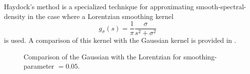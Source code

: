Haydock's method \cite{haydock1972electronic,lin2016review} is a specialized technique for approximating \gls{smooth-spectral-density}
in the case where a Lorentzian smoothing kernel
\begin{equation}
    g_{\sigma}(s) = \frac{1}{\pi} \frac{\sigma}{s^2 + \sigma^2}%
    \label{equ:5-experiments-cauchy-kernel}
\end{equation}
is used. A comparison of this kernel with the Gaussian kernel 
is provided in .\\
\begin{figure}[ht]
    \centering
    
    \caption{Comparison of the Gaussian with the Lorentzian 
        for \gls{smoothing-parameter} $=0.05$.}
    \label{fig:5-experiments-haydock-kernel}
\end{figure}

